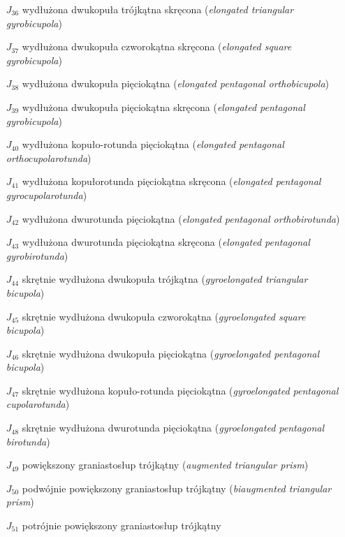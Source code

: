 \begin{itemize}
    \item [$J_{36}$] {wydłużona dwukopuła trójkątna skręcona}
                     (\emph{elongated triangular gyrobicupola})
    \item [$J_{37}$] {wydłużona dwukopuła czworokątna skręcona}
                     (\emph{elongated square gyrobicupola})
    \item [$J_{38}$] {wydłużona dwukopuła pięciokątna}
                     (\emph{elongated pentagonal orthobicupola})
    \item [$J_{39}$] {wydłużona dwukopuła pięciokątna skręcona}
                     (\emph{elongated pentagonal gyrobicupola})
    \item [$J_{40}$] {wydłużona kopuło-rotunda pięciokątna}
                     (\emph{elongated pentagonal orthocupolarotunda})
    \item [$J_{41}$] {wydłużona kopułorotunda pięciokątna skręcona}
                     (\emph{elongated pentagonal gyrocupolarotunda})
    \item [$J_{42}$] {wydłużona dwurotunda pięciokątna}
                     (\emph{elongated pentagonal orthobirotunda})
    \item [$J_{43}$] {wydłużona dwurotunda pięciokątna skręcona}
                     (\emph{elongated pentagonal gyrobirotunda})
    \item [$J_{44}$] {skrętnie wydłużona dwukopuła trójkątna}
                     (\emph{gyroelongated triangular bicupola})
    \item [$J_{45}$] {skrętnie wydłużona dwukopuła czworokątna}
                     (\emph{gyroelongated square bicupola})
    \item [$J_{46}$] {skrętnie wydłużona dwukopuła pięciokątna}
                     (\emph{gyroelongated pentagonal bicupola})
    \item [$J_{47}$] {skrętnie wydłużona kopuło-rotunda pięciokątna}
                     (\emph{gyroelongated pentagonal cupolarotunda})
    \item [$J_{48}$] {skrętnie wydłużona dwurotunda pięciokątna}
                     (\emph{gyroelongated pentagonal birotunda})
    \item [$J_{49}$] {powiększony graniastosłup trójkątny}
                     (\emph{augmented triangular prism})
    \item [$J_{50}$] {podwójnie powiększony graniastosłup trójkątny}
                     (\emph{biaugmented triangular prism})
    \item [$J_{51}$] {potrójnie powiększony graniastosłup trójkątny}

\end{itemize}
